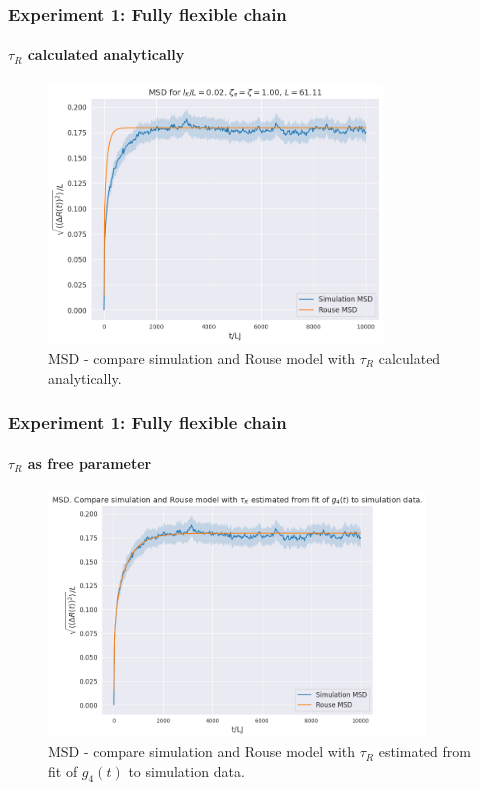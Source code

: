 \documentclass[handout]{beamer}
\begin{document}
\begin{frame}
    \frametitle{Experiment 1: Fully flexible chain}
    \framesubtitle{$\tau_R$ calculated analytically}

    \begin{figure}[h]
        \includegraphics[trim={0.1cm 0.1cm 0.1cm 1cm},clip,height=6.9cm]{./3-exp-fixed-param.png}
        \caption{MSD - compare simulation and Rouse model with $\tau_R$ calculated analytically.}
        \label{fig:full-flex-chain-fixed}
    \end{figure}
\end{frame}


\begin{frame}
    \frametitle{Experiment 1: Fully flexible chain}
    \framesubtitle{$\tau_R$ as free parameter}

    \begin{figure}[h]
        \includegraphics[trim={0.1cm 0.1cm 0.1cm 1cm},clip,height=6.5cm]{./3-exp-free-param.png}
        \caption{MSD - compare simulation and Rouse model 
        with $\tau_R$ estimated from fit of $g_4(t)$ to simulation data.}
        \label{fig:full-flex-chain-free}
    \end{figure}
\end{frame}
\end{document}
